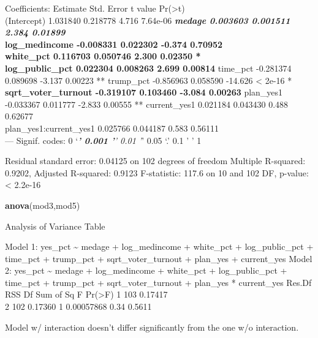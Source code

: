 \documentclass[
]{article}
\newenvironment{Shaded}{\begin{snugshade}}{\end{snugshade}}
\newcommand{\KeywordTok}[1]{\textcolor[rgb]{0.13,0.29,0.53}{\textbf{#1}}}
\newcommand{\NormalTok}[1]{#1}
\begin{document}
Coefficients: Estimate Std. Error t value
Pr(\textgreater\textbar t\textbar)\\
(Intercept) 1.031840 0.218778 4.716 7.64e-06 \textbf{\emph{ medage
0.003603 0.001511 2.384 0.01899 }\\
log\_medincome -0.008331 0.022302 -0.374 0.70952\\
white\_pct 0.116703 0.050746 2.300 0.02350 *\\
log\_public\_pct 0.022304 0.008263 2.699 0.00814 } time\_pct -0.281374
0.089698 -3.137 0.00223 ** trump\_pct -0.856963 0.058590 -14.626
\textless{} 2e-16 *\textbf{ sqrt\_voter\_turnout -0.319107 0.103460
-3.084 0.00263 } plan\_yes1 -0.033367 0.011777 -2.833 0.00555 **
current\_yes1 0.021184 0.043430 0.488 0.62677\\
plan\_yes1:current\_yes1 0.025766 0.044187 0.583 0.56111\\
--- Signif. codes: 0 `\emph{\textbf{' 0.001 '}' 0.01 '}' 0.05 `.' 0.1 '
' 1

Residual standard error: 0.04125 on 102 degrees of freedom Multiple
R-squared: 0.9202, Adjusted R-squared: 0.9123 F-statistic: 117.6 on 10
and 102 DF, p-value: \textless{} 2.2e-16

\begin{Shaded}
\begin{Highlighting}[]
\KeywordTok{anova}\NormalTok{(mod3,mod5)}
\end{Highlighting}
\end{Shaded}

Analysis of Variance Table

Model 1: yes\_pct \textasciitilde{} medage + log\_medincome + white\_pct
+ log\_public\_pct + time\_pct + trump\_pct + sqrt\_voter\_turnout +
plan\_yes + current\_yes Model 2: yes\_pct \textasciitilde{} medage +
log\_medincome + white\_pct + log\_public\_pct + time\_pct + trump\_pct
+ sqrt\_voter\_turnout + plan\_yes * current\_yes Res.Df RSS Df Sum of
Sq F Pr(\textgreater F) 1 103 0.17417\\
2 102 0.17360 1 0.00057868 0.34 0.5611

Model w/ interaction doesn't differ significantly from the one w/o
interaction.
\end{document}
